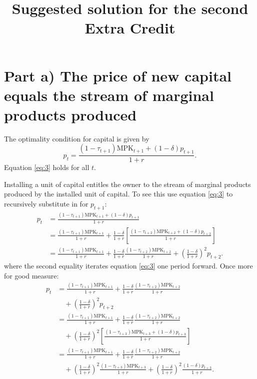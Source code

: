 \documentclass[12pt]{pracjourn_rwr}
\title{Suggested solution for the second Extra Credit}
\theoremstyle{definition}
\theoremstyle{remark}
\begin{document}
\maketitle


\section{Part a) The price of new capital equals the stream of marginal products produced}

The optimality condition for capital is given by
\begin{equation}
\label{eq:3}
p_{t} = \frac{(1-\tau_{t+1}) \text{MPK}_{t+1} + (1-\delta)p_{t+1}}{1+r}.
\end{equation}
Equation \eqref{eq:3} holds for all $t$.

Installing a unit of capital entitles the owner to the stream of marginal products produced by the installed unit of capital.
To see this use equation \eqref{eq:3} to recursively substitute in for $p_{t+1}$:
\begin{align*}
p_{t} &= \frac{(1-\tau_{t+1}) \text{MPK}_{t+1} + (1-\delta)p_{t+1}}{1+r} \\
&= \frac{(1-\tau_{t+1}) \text{MPK}_{t+1}}{1+r} + \frac{1-\delta}{1+r}
\left[ \frac{(1-\tau_{t+2}) \text{MPK}_{t+2} + (1-\delta)p_{t+2}}{1+r} \right] \\
&= \frac{(1-\tau_{t+1}) \text{MPK}_{t+1}}{1+r} + \frac{1-\delta}{1+r} \frac{(1-\tau_{t+2}) \text{MPK}_{t+2}}{1+r} +
\left( \frac{1-\delta}{1+r}  \right)^{2} p_{t+2}.
\end{align*}
where the second equality iterates equation \eqref{eq:3} one period forward.
Once more for good measure:
\begin{align*}
p_{t} &= \frac{(1-\tau_{t+1}) \text{MPK}_{t+1}}{1+r} + \frac{1-\delta}{1+r} \frac{(1-\tau_{t+2}) \text{MPK}_{t+2}}{1+r} \\
&\quad + \left( \frac{1-\delta}{1+r}  \right)^{2} p_{t+2} \\
&= \frac{(1-\tau_{t+1}) \text{MPK}_{t+1}}{1+r} + \frac{1-\delta}{1+r} \frac{(1-\tau_{t+2}) \text{MPK}_{t+2}}{1+r} \\
&\quad + \left( \frac{1-\delta}{1+r}  \right)^{2} \left[ \frac{(1-\tau_{t+3}) \text{MPK}_{t+3} + (1-\delta)p_{t+3}}{1+r} \right] \\
&= \frac{(1-\tau_{t+1}) \text{MPK}_{t+1}}{1+r} + \frac{1-\delta}{1+r} \frac{(1-\tau_{t+2}) \text{MPK}_{t+2}}{1+r} \\
&\quad + \left( \frac{1-\delta}{1+r}  \right)^{2} \frac{(1-\tau_{t+3}) \text{MPK}_{t+3}}{1+r}
+ \left( \frac{1-\delta}{1+r}  \right)^{2} \frac{(1-\delta)p_{t+3}}{1+r}.
\end{align*}
\end{document}
